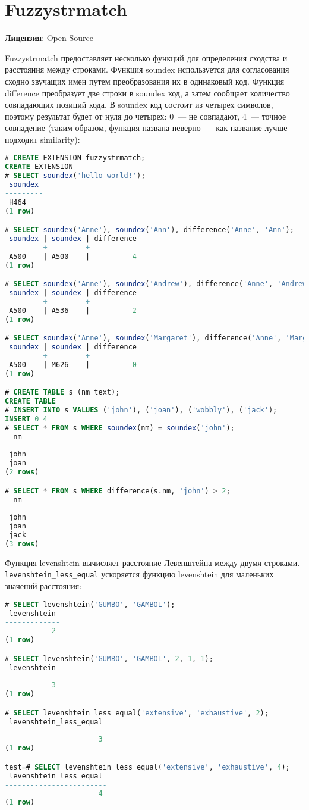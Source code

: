 \section{Fuzzystrmatch}
\textbf{Лицензия}: Open Source

Fuzzystrmatch предоставляет несколько функций для определения сходства и расстояния между строками. Функция soundex используется для согласования сходно звучащих имен путем преобразования их в одинаковый код. Функция difference преобразует две строки в soundex код, а затем сообщает количество совпадающих позиций кода. В soundex код состоит из четырех символов, поэтому результат будет от нуля до четырех: 0~--- не совпадают, 4~--- точное совпадение (таким образом, функция названа неверно~--- как название лучше подходит similarity):

\begin{lstlisting}[language=SQL,label=lst:ext_fuzzystrmatch1,caption=soundex]
# CREATE EXTENSION fuzzystrmatch;
CREATE EXTENSION
# SELECT soundex('hello world!');
 soundex
---------
 H464
(1 row)

# SELECT soundex('Anne'), soundex('Ann'), difference('Anne', 'Ann');
 soundex | soundex | difference
---------+---------+------------
 A500    | A500    |          4
(1 row)

# SELECT soundex('Anne'), soundex('Andrew'), difference('Anne', 'Andrew');
 soundex | soundex | difference
---------+---------+------------
 A500    | A536    |          2
(1 row)

# SELECT soundex('Anne'), soundex('Margaret'), difference('Anne', 'Margaret');
 soundex | soundex | difference
---------+---------+------------
 A500    | M626    |          0
(1 row)

# CREATE TABLE s (nm text);
CREATE TABLE
# INSERT INTO s VALUES ('john'), ('joan'), ('wobbly'), ('jack');
INSERT 0 4
# SELECT * FROM s WHERE soundex(nm) = soundex('john');
  nm
------
 john
 joan
(2 rows)

# SELECT * FROM s WHERE difference(s.nm, 'john') > 2;
  nm
------
 john
 joan
 jack
(3 rows)
\end{lstlisting}

Функция levenshtein вычисляет \href{http://en.wikipedia.org/wiki/Levenshtein\_distance}{расстояние Левенштейна} между двумя строками. \lstinline!levenshtein_less_equal! ускоряется функцию levenshtein для маленьких значений расстояния:

\begin{lstlisting}[language=SQL,label=lst:ext_fuzzystrmatch2,caption=levenshtein]
# SELECT levenshtein('GUMBO', 'GAMBOL');
 levenshtein
-------------
           2
(1 row)

# SELECT levenshtein('GUMBO', 'GAMBOL', 2, 1, 1);
 levenshtein
-------------
           3
(1 row)

# SELECT levenshtein_less_equal('extensive', 'exhaustive', 2);
 levenshtein_less_equal
------------------------
                      3
(1 row)

test=# SELECT levenshtein_less_equal('extensive', 'exhaustive', 4);
 levenshtein_less_equal
------------------------
                      4
(1 row)
\end{lstlisting}

